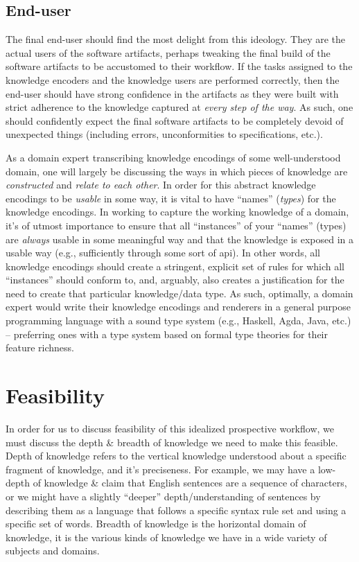 \subsection{End-user}

The final end-user should find the most delight from this ideology. They are the
actual users of the software artifacts, perhaps tweaking the final build of the
software artifacts to be accustomed to their workflow. If the tasks assigned to
the knowledge encoders and the knowledge users are performed correctly, then the
end-user should have strong confidence in the artifacts as they were built with
strict adherence to the knowledge captured at \textit{every step of the way}. As
such, one should confidently expect the final software artifacts to be
completely devoid of unexpected things (including errors, unconformities to
specifications, etc.).

As a domain expert transcribing knowledge encodings of some well-understood
domain, one will largely be discussing the ways in which pieces of knowledge are
\textit{constructed} and \textit{relate to each other}. In order for this
abstract knowledge encodings to be \textit{usable} in some way, it is vital to
have ``names'' (\textit{types}) for the knowledge encodings. In working to
capture the working knowledge of a domain, it's of utmost importance to ensure
that all ``instances'' of your ``names'' (types) are \textit{always} usable in
some meaningful way and that the knowledge is exposed in a usable way (e.g.,
sufficiently through some sort of \acs{api}). In other words, all knowledge
encodings should create a stringent, explicit set of rules for which all
``instances'' should conform to, and, arguably, also creates a justification for
the need to create that particular knowledge/data type. As such, optimally, a
domain expert would write their knowledge encodings and renderers in a general
purpose programming language with a sound type system (e.g., Haskell, Agda,
Java, etc.) -- preferring ones with a type system based on formal type theories
for their feature richness.

\section{Feasibility}
\label{sec:idlgy:feasibility}

In order for us to discuss feasibility of this idealized prospective workflow,
we must discuss the depth \& breadth of knowledge we need to make this feasible.
Depth of knowledge refers to the vertical knowledge understood about a specific
fragment of knowledge, and it's preciseness. For example, we may have a
low-depth of knowledge \& claim that English sentences are a sequence of
characters, or we might have a slightly ``deeper'' depth/understanding  of
sentences by describing them as a language that follows a specific syntax rule
set and using a specific set of words. Breadth of knowledge is the horizontal
domain of knowledge, it is the various kinds of knowledge we have in a wide
variety of subjects and domains.

